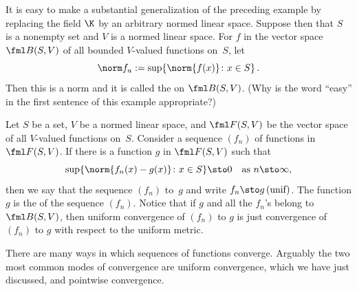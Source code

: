 \begin{exam}\label{C023133} It is easy to make a substantial generalization of the preceding
example by replacing the field $\K$ by an arbitrary normed linear space. Suppose then
that $S$ is a nonempty set and $V$ is a normed linear space. For $f$ in the vector space $\fml B(S,V)$ of all bounded $V$-valued functions on~$S$, let
  \[ \norm f_u := \sup\{\norm{f(x)} \colon x \in S\}\,. \]
Then this is a norm and it is called the
 on $\fml B(S,V)$.   (Why is the word ``easy'' in the first sentence of this example appropriate?)
\end{exam}

\begin{defn} Let $S$ be a set, $V$ be a normed linear space, and
$\fml F(S,V)$ be the vector space of all $V$-valued functions on~$S$.
Consider a sequence $(f_n)$ of functions in $\fml F(S,V)$.  If there is a function $g$ in $\fml F(S,V)$ such that
   \[ \sup\{\norm{f_n(x) - g(x)}\colon x \in S\} \sto 0 \quad \text{as $n \sto \infty$,} \]
then we say that the sequence $(f_n)$
 to~$g$ and write $f_n \sto g \text{\,(unif)}$.  The function $g$
is the
 of the sequence $(f_n)$.  Notice that if $g$ and all the $f_n$'s
belong to $\fml B(S,V)$, then uniform convergence of $(f_n)$ to $g$ is just convergence
of $(f_n)$ to $g$ with respect to the uniform metric.
\end{defn}

There are many ways in which sequences of functions converge.  Arguably the two most
common modes of convergence are uniform convergence, which we have just discussed, and
pointwise convergence.

